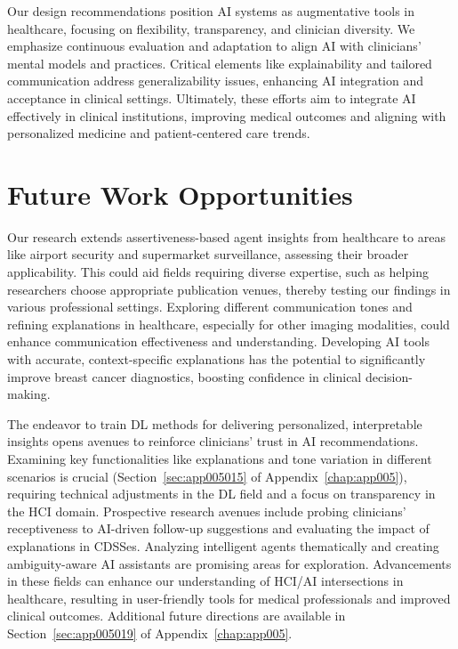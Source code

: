 \textcolor{revised}{Our design recommendations position \ac{AI} systems as augmentative tools in healthcare, focusing on flexibility, transparency, and clinician diversity.
We emphasize continuous evaluation and adaptation to align \ac{AI} with clinicians' mental models and practices.
Critical elements like explainability and tailored communication address generalizability issues, enhancing \ac{AI} integration and acceptance in clinical settings.
Ultimately, these efforts aim to integrate \ac{AI} effectively in clinical institutions, improving medical outcomes and aligning with personalized medicine and patient-centered care trends.}

\section{Future Work Opportunities}
\label{sec:chap007004}

\textcolor{revised}{Our research extends assertiveness-based agent insights from healthcare to areas like airport security and supermarket surveillance, assessing their broader applicability.
This could aid fields requiring diverse expertise, such as helping researchers choose appropriate publication venues, thereby testing our findings in various professional settings.
Exploring different communication tones and refining explanations in healthcare, especially for other imaging modalities, could enhance communication effectiveness and understanding.
Developing \ac{AI} tools with accurate, context-specific explanations has the potential to significantly improve breast cancer diagnostics, boosting confidence in clinical decision-making.}

\textcolor{revised}{The endeavor to train \ac{DL} methods for delivering personalized, interpretable insights opens avenues to reinforce clinicians' trust in \ac{AI} recommendations.
Examining key functionalities like explanations and tone variation in different scenarios is crucial (Section~\ref{sec:app005015} of Appendix~\ref{chap:app005}), requiring technical adjustments in the \ac{DL} field and a focus on transparency in the \ac{HCI} domain.
Prospective research avenues include probing clinicians' receptiveness to \acs{AI}-driven follow-up suggestions and evaluating the impact of explanations in \acp{CDSSe}.
Analyzing intelligent agents thematically and creating ambiguity-aware \ac{AI} assistants are promising areas for exploration.
Advancements in these fields can enhance our understanding of \ac{HCI}/\ac{AI} intersections in healthcare, resulting in user-friendly tools for medical professionals and improved clinical outcomes.
Additional future directions are available in Section~\ref{sec:app005019} of Appendix~\ref{chap:app005}.}